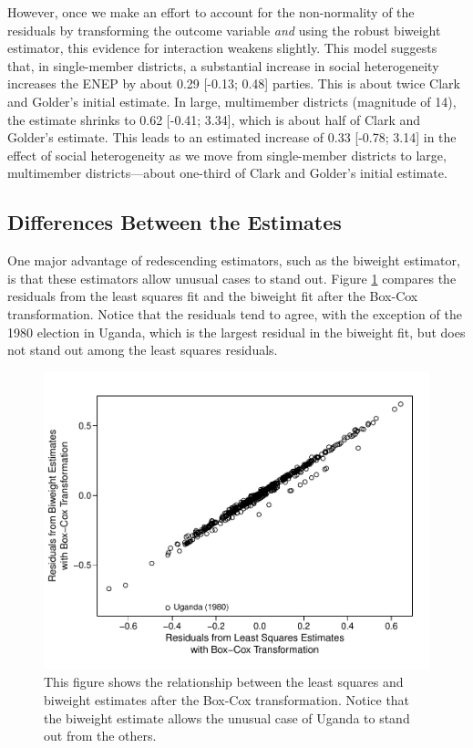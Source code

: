 \documentclass[12pt]{article}
\begin{document}
However, once we make an effort to account for the non-normality of the residuals by transforming the outcome variable \textit{and} using the robust biweight estimator, this evidence for interaction weakens slightly. 
This model suggests that, in single-member districts, a substantial increase in social heterogeneity increases the ENEP by about 0.29 [-0.13; 0.48] parties. 
This is about twice Clark and Golder's initial estimate.
In large, multimember districts (magnitude of 14), the estimate shrinks to 0.62 [-0.41; 3.34], which is about half of Clark and Golder's estimate. 
This leads to an estimated increase of 0.33 [-0.78; 3.14] in the effect of social heterogeneity as we move from single-member districts to large, multimember districts---about one-third of Clark and Golder's initial estimate.

\subsection*{Differences Between the Estimates}

One major advantage of redescending estimators, such as the biweight estimator, is that these estimators allow unusual cases to stand out. 
Figure \ref{fig:cg-residuals-compare} compares the residuals from the least squares fit and the biweight fit after the Box-Cox transformation. 
Notice that the residuals tend to agree, with the exception of the 1980 election in Uganda, which is the largest residual in the biweight fit, but does not stand out among the least squares residuals.

\begin{figure}[h!]
\begin{center}
\includegraphics[scale = 0.6]{figs/cg-residuals-compare.pdf}
\caption{This figure shows the relationship between the least squares and biweight estimates after the Box-Cox transformation. 
Notice that the biweight estimate allows the unusual case of Uganda to stand out from the others.}\label{fig:cg-residuals-compare}
\end{center}
\end{figure}
\end{document}

